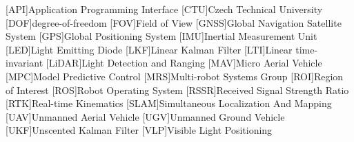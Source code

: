 
\begin{acronym}
  [API]{Application Programming Interface}
  [CTU]{Czech Technical University}
  [DOF]{degree-of-freedom}
  [FOV]{Field of View}
  [GNSS]{Global Navigation Satellite System}
  [GPS]{Global Positioning System}
  [IMU]{Inertial Measurement Unit}
  [LED]{Light Emitting Diode}
  [LKF]{Linear Kalman Filter}
  [LTI]{Linear time-invariant}
  [LiDAR]{Light Detection and Ranging}
  [MAV]{Micro Aerial Vehicle}
  [MPC]{Model Predictive Control}
  [MRS]{Multi-robot Systems Group}
  [ROI]{Region of Interest}
  [ROS]{Robot Operating System}
  [RSSR]{Received Signal Strength Ratio}
  [RTK]{Real-time Kinematics}
  [SLAM]{Simultaneous Localization And Mapping}
  [UAV]{Unmanned Aerial Vehicle}
  [UGV]{Unmanned Ground Vehicle}
  [UKF]{Unscented Kalman Filter}
  [VLP]{Visible Light Positioning}
\end{acronym}
